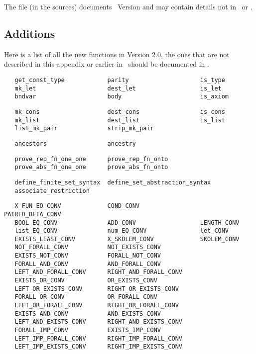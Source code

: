 \noindent The file  (in the sources) documents \HOL\
Version  and may contain details not in \DESCRIPTION\ or
\REFERENCE.

\subsection{Additions}

Here is a list of all the new functions in Version 2.0, the ones that
are not described in this appendix or earlier in \DESCRIPTION\ should be
documented in \REFERENCE.

\begin{hol}\begin{verbatim}
   get_const_type            parity                    is_type
   mk_let                    dest_let                  is_let
   bndvar                    body                      is_axiom
\end{verbatim}\end{hol}
\begin{hol}\begin{verbatim}
   mk_cons                   dest_cons                 is_cons
   mk_list                   dest_list                 is_list
   list_mk_pair              strip_mk_pair
\end{verbatim}\end{hol}
\begin{hol}\begin{verbatim}
   ancestors                 ancestry
\end{verbatim}\end{hol}
\begin{hol}\begin{verbatim}
   prove_rep_fn_one_one      prove_rep_fn_onto
   prove_abs_fn_one_one      prove_abs_fn_onto
\end{verbatim}\end{hol}
\begin{hol}\begin{verbatim}
   define_finite_set_syntax  define_set_abstraction_syntax
   associate_restriction
\end{verbatim}\end{hol}
\begin{hol}\begin{verbatim}
   X_FUN_EQ_CONV             COND_CONV                 PAIRED_BETA_CONV
   BOOL_EQ_CONV              ADD_CONV                  LENGTH_CONV
   list_EQ_CONV              num_EQ_CONV               let_CONV
   EXISTS_LEAST_CONV         X_SKOLEM_CONV             SKOLEM_CONV
   NOT_FORALL_CONV           NOT_EXISTS_CONV
   EXISTS_NOT_CONV           FORALL_NOT_CONV
   FORALL_AND_CONV           AND_FORALL_CONV
   LEFT_AND_FORALL_CONV      RIGHT_AND_FORALL_CONV
   EXISTS_OR_CONV            OR_EXISTS_CONV
   LEFT_OR_EXISTS_CONV       RIGHT_OR_EXISTS_CONV
   FORALL_OR_CONV            OR_FORALL_CONV
   LEFT_OR_FORALL_CONV       RIGHT_OR_FORALL_CONV
   EXISTS_AND_CONV           AND_EXISTS_CONV
   LEFT_AND_EXISTS_CONV      RIGHT_AND_EXISTS_CONV
   FORALL_IMP_CONV           EXISTS_IMP_CONV
   LEFT_IMP_FORALL_CONV      RIGHT_IMP_FORALL_CONV
   LEFT_IMP_EXISTS_CONV      RIGHT_IMP_EXISTS_CONV
\end{verbatim}\end{hol}
